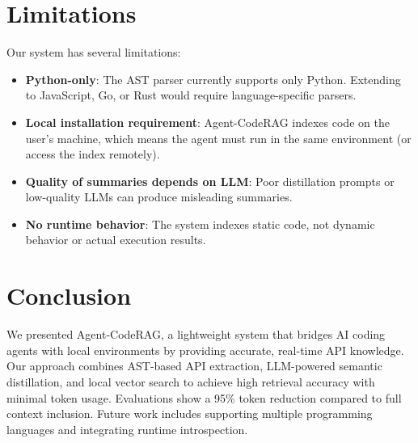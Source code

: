 \documentclass[10pt,twocolumn]{article}
\begin{document}
\section{Limitations}
\label{sec:limitations}

Our system has several limitations:

\begin{itemize}
    \item \textbf{Python-only}: The AST parser currently supports only Python. Extending to JavaScript, Go, or Rust would require language-specific parsers.
    \item \textbf{Local installation requirement}: Agent-CodeRAG indexes code on the user's machine, which means the agent must run in the same environment (or access the index remotely).
    \item \textbf{Quality of summaries depends on LLM}: Poor distillation prompts or low-quality LLMs can produce misleading summaries.
    \item \textbf{No runtime behavior}: The system indexes static code, not dynamic behavior or actual execution results.
\end{itemize}

\section{Conclusion}
\label{sec:conclusion}

We presented Agent-CodeRAG, a lightweight system that bridges AI coding agents with local environments by providing accurate, real-time API knowledge. Our approach combines AST-based API extraction, LLM-powered semantic distillation, and local vector search to achieve high retrieval accuracy with minimal token usage. Evaluations show a 95\% token reduction compared to full context inclusion. Future work includes supporting multiple programming languages and integrating runtime introspection.
\end{document}
